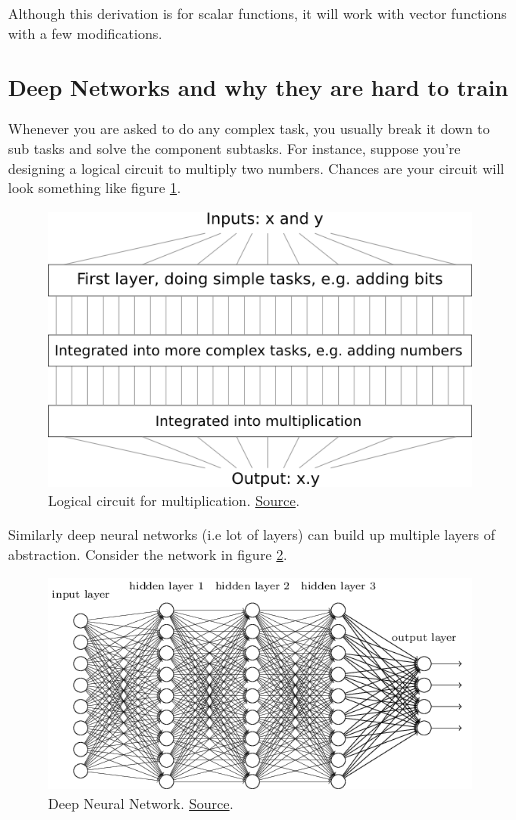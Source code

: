 \documentclass[a4paper]{tufte-handout}
\begin{document}
Although this derivation is for scalar functions, it will work with
vector functions with a few modifications.

\subsection{Deep Networks and why they are hard to train}\label{deep-neural-networks}

Whenever you are asked to do any complex task, you usually break it down
to sub tasks and solve the component subtasks. For instance, suppose
you're designing a logical circuit to multiply two numbers. Chances are
your circuit will look something like figure \ref{fig:circuitmult}.

\begin{figure}
\includegraphics[width=0.7\linewidth]{circuit_multiplication}
\caption{Logical circuit for multiplication.
\href{http://neuralnetworksanddeeplearning.com/chap5.html\%22}{Source}.
}
\label{fig:circuitmult}
\end{figure}

Similarly deep neural networks (i.e lot of layers) can build up multiple
layers of abstraction. Consider the network in figure \ref{fig:dnn}.

\begin{figure}
\includegraphics[width=\linewidth]{tikz36}
\caption{Deep Neural Network.
\href{http://neuralnetworksanddeeplearning.com/chap5.html\%22}{Source}.}
\label{fig:dnn}
\end{figure}
\end{document}

